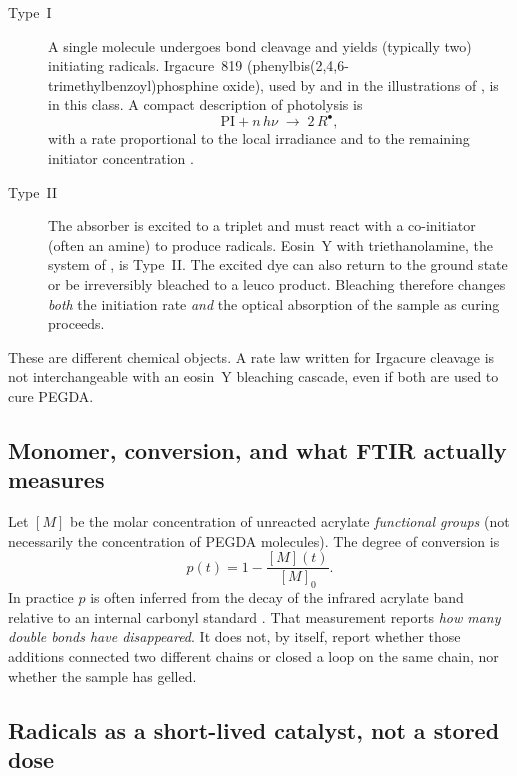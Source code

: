 \begin{description}
  \item[Type~I]
    A single molecule undergoes bond cleavage and yields (typically two) initiating radicals.
    Irgacure~819 (phenylbis(2,4,6-trimethylbenzoyl)phosphine oxide), used by \citet{Montgomery2022} and in the illustrations of \citet{Dobson2024}, is in this class.
    A compact description of photolysis is
    \begin{equation}
      \mathrm{PI} + n\,h\nu \;\longrightarrow\; 2\,R^\bullet,
      \label{eq:typeI}
    \end{equation}
    with a rate proportional to the local irradiance and to the remaining initiator concentration \citep{Montgomery2022}.
  \item[Type~II]
    The absorber is excited to a triplet and must react with a co-initiator (often an amine) to produce radicals.
    Eosin~Y with triethanolamine, the system of \citet{Zhu2020}, is Type~II.
    The excited dye can also return to the ground state or be irreversibly bleached to a leuco product.
    Bleaching therefore changes \emph{both} the initiation rate \emph{and} the optical absorption of the sample as curing proceeds.
\end{description}

These are different chemical objects.
A rate law written for Irgacure cleavage is not interchangeable with an eosin~Y bleaching cascade, even if both are used to cure PEGDA.

\subsection{Monomer, conversion, and what FTIR actually measures}

Let $[M]$ be the molar concentration of unreacted acrylate \emph{functional groups} (not necessarily the concentration of PEGDA molecules).
The degree of conversion is
\begin{equation}
  p(t) = 1 - \frac{[M](t)}{[M]_0}.
  \label{eq:conversion}
\end{equation}
In practice $p$ is often inferred from the decay of the infrared acrylate band relative to an internal carbonyl standard \citep{Montgomery2022}.
That measurement reports \emph{how many double bonds have disappeared}.
It does not, by itself, report whether those additions connected two different chains or closed a loop on the same chain, nor whether the sample has gelled.

\subsection{Radicals as a short-lived catalyst, not a stored dose}

